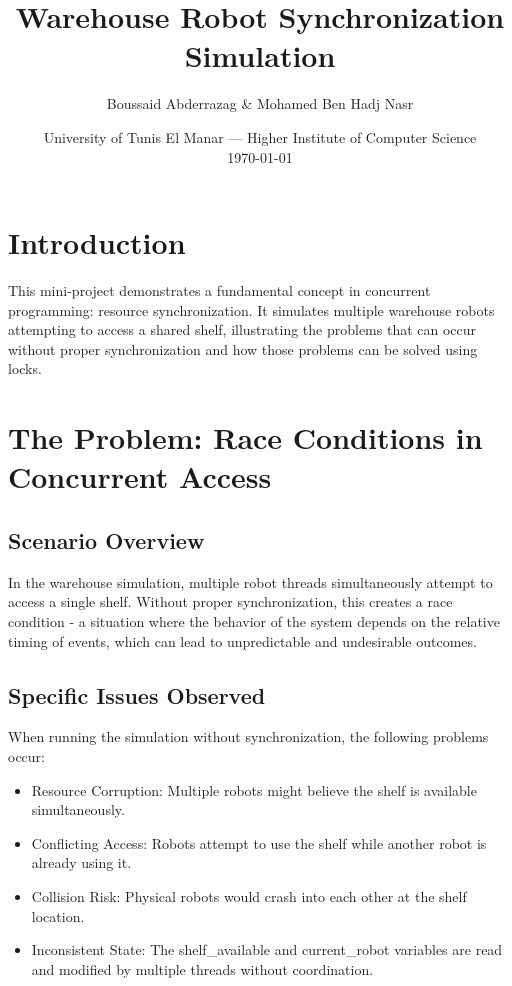 \documentclass{article}
\title{Warehouse Robot Synchronization Simulation} %
\author{Boussaid Abderrazag & Mohamed Ben Hadj Nasr}
\date{University of Tunis El Manar --- Higher Institute of Computer Science \\ \today} %
\begin{document}
\maketitle %


\section*{Introduction} %

This mini-project demonstrates a fundamental concept in concurrent programming: resource synchronization. It simulates multiple warehouse robots attempting to access a shared shelf, illustrating the problems that can occur without proper synchronization and how those problems can be solved using locks.

\section{The Problem: Race Conditions in Concurrent Access}

\subsection{Scenario Overview}

In the warehouse simulation, multiple robot threads simultaneously attempt to access a single shelf. Without proper synchronization, this creates a race condition - a situation where the behavior of the system depends on the relative timing of events, which can lead to unpredictable and undesirable outcomes.

\subsection{Specific Issues Observed}
When running the simulation without synchronization, the following problems occur:

\begin{itemize}
	\item Resource Corruption: Multiple robots might believe the shelf is available simultaneously.
	\item Conflicting Access: Robots attempt to use the shelf while another robot is already using it.
	\item Collision Risk: Physical robots would crash into each other at the shelf location.
	\item Inconsistent State: The shelf\_available and current\_robot variables are read and modified by multiple threads without coordination.
\end{itemize}
\end{document}
